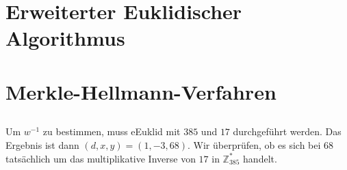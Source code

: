 \documentclass{../crypto}
\begin{document}
\section{Erweiterter Euklidischer Algorithmus}

\subsection{}
\subsection{}
\subsection{}

\section{Merkle-Hellmann-Verfahren}

%
%
%
%
%

\subsection{}
Um $w^{-1}$ zu bestimmen, muss eEuklid mit $385$ und $17$ durchgeführt werden. Das
Ergebnis ist dann $(d,x,y) = (1,-3,68)$. Wir überprüfen, ob es sich bei $68$
tatsächlich um das multiplikative Inverse von $17$ in $\mathbb{Z}_{385}^*$ handelt.
\end{document}
